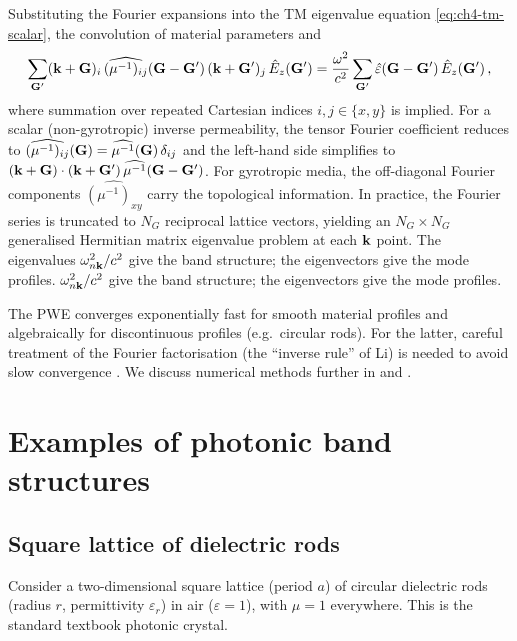 Substituting the Fourier expansions into the TM eigenvalue equation
\eqref{eq:ch4-tm-scalar}, the convolution of material parameters and
\begin{equation}\label{eq:ch4-pwe-matrix}
  \sum_{\mathbf{G}'}
  (\mathbf{k}+\mathbf{G})_i\,
  \widehat{(\mu^{-1})_{ij}}(\mathbf{G}-\mathbf{G}')\,
  (\mathbf{k}+\mathbf{G}')_j\,\hat{E}_z(\mathbf{G}')
  = \frac{\omega^2}{c^2}\sum_{\mathbf{G}'}
    \hat{\varepsilon}(\mathbf{G}-\mathbf{G}')\,\hat{E}_z(\mathbf{G}')\,,
\end{equation}
where summation over repeated Cartesian indices $i,j\in\{x,y\}$ is
implied.  For a scalar (non-gyrotropic) inverse permeability, the
tensor Fourier coefficient reduces to
$\widehat{(\mu^{-1})_{ij}}(\mathbf{G})=\widehat{\mu^{-1}}(\mathbf{G})\,
\delta_{ij}$ and the left-hand side simplifies to
$(\mathbf{k}+\mathbf{G})\cdot(\mathbf{k}+\mathbf{G}')\,\widehat{\mu^{-1}}(\mathbf{G}-\mathbf{G}')$.
For gyrotropic media, the off-diagonal Fourier components
$\widehat{(\mu^{-1})_{xy}}$ carry the topological information.
In practice, the Fourier series is truncated to $N_G$ reciprocal
lattice vectors, yielding an $N_G\times N_G$ generalised Hermitian
matrix eigenvalue problem at each $\mathbf{k}$ point.  The eigenvalues
$\omega_{n\mathbf{k}}^2/c^2$ give the band structure; the eigenvectors give
the mode profiles.
$\omega_{n\mathbf{k}}^2/c^2$ give the band structure; the eigenvectors give
the mode profiles.

\begin{remark}[Convergence]
  The PWE converges exponentially fast for smooth material profiles and
  algebraically for discontinuous profiles (e.g.\ circular rods).  For
  the latter, careful treatment of the Fourier factorisation (the
  ``inverse rule'' of Li) is needed to avoid slow convergence \cite{raman2010photonic}.  We
  discuss numerical methods further in  and
  .
\end{remark}

\section{Examples of photonic band structures}
\label{sec:ch4-examples}

\subsection{Square lattice of dielectric rods}
\label{sec:ch4-square-rods}

Consider a two-dimensional square lattice (period $a$) of circular
dielectric rods (radius $r$, permittivity $\varepsilon_r$) in air
($\varepsilon=1$), with $\mu=1$ everywhere.  This is the standard
textbook photonic crystal.

